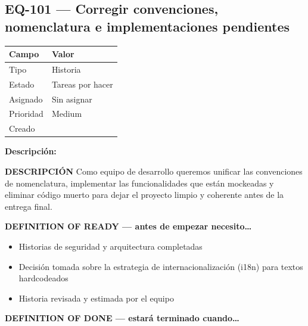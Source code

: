 \documentclass[
  spanish,
  11pt,
]{report}
\newcounter{none} %
\providecommand{\tightlist}{%
  \setlength{\itemsep}{0pt}\setlength{\parskip}{0pt}}
\begin{document}
\subsection{EQ-101 --- Corregir convenciones, nomenclatura e
implementaciones
pendientes}\label{eq-101-corregir-convenciones-nomenclatura-e-implementaciones-pendientes}

{\def\LTcaptype{none} %
\begin{longtable}[]{@{}ll@{}}
\toprule\noalign{}
Campo & Valor \\
\midrule\noalign{}
\endhead
\bottomrule\noalign{}
\endlastfoot
Tipo & Historia \\
Estado & Tareas por hacer \\
Asignado & Sin asignar \\
Prioridad & Medium \\
Creado & \\
\end{longtable}
}

\textbf{Descripción:}

\textbf{DESCRIPCIÓN} Como equipo de desarrollo queremos unificar las
convenciones de nomenclatura, implementar las funcionalidades que están
mockeadas y eliminar código muerto para dejar el proyecto limpio y
coherente antes de la entrega final.

\textbf{DEFINITION OF READY --- antes de empezar necesito\ldots{}}

\begin{itemize}
\tightlist
\item
  Historias de seguridad y arquitectura completadas
\item
  Decisión tomada sobre la estrategia de internacionalización (i18n)
  para textos hardcodeados
\item
  Historia revisada y estimada por el equipo
\end{itemize}

\textbf{DEFINITION OF DONE --- estará terminado cuando\ldots{}}
\end{document}
